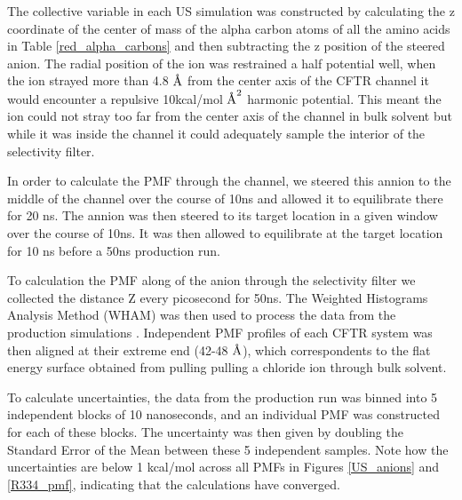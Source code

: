 The collective variable in each US simulation was constructed by calculating the z coordinate of the center of mass of the alpha carbon atoms of all the amino acids in Table \ref{red_alpha_carbons} and then subtracting the z position of the steered anion. The radial position of the ion was restrained a half potential well, when the ion strayed more than 4.8 $\textup{\AA}$ from the center axis of the CFTR channel it would encounter a repulsive 10kcal/mol $\textup{\AA}^2$ harmonic potential. This meant the ion could not stray too far from the center axis of the channel in bulk solvent but while it was inside the channel it could adequately sample the interior of the selectivity filter.

In order to calculate the PMF through the channel, we steered this annion to the middle of the channel over the course of 10ns and allowed it to equilibrate there for 20 ns. The annion was then steered to its target location in a given window over the course of 10ns. It was then allowed to equilibrate at the target location for 10 ns before a 50ns production run.

To calculation the PMF along of the anion through the selectivity filter we collected the distance Z every picosecond for 50ns. The Weighted Histograms Analysis Method (WHAM) was then used to process the data from the production simulations \cite{grossfield2012}. Independent PMF profiles of each CFTR system was then aligned at their extreme end (42-48 $\textup{\AA}$), which correspondents to the flat energy surface obtained from pulling pulling a chloride ion through bulk solvent. 

To calculate uncertainties, the data from the production run was binned into 5 independent blocks of 10 nanoseconds, and an individual PMF was constructed for each of these blocks. The uncertainty was then given by doubling the Standard Error of the Mean between these 5 independent samples. Note how the uncertainties are below 1 kcal/mol across all PMFs in Figures \ref{US_anions} and \ref{R334_pmf}, indicating that the calculations have converged.
